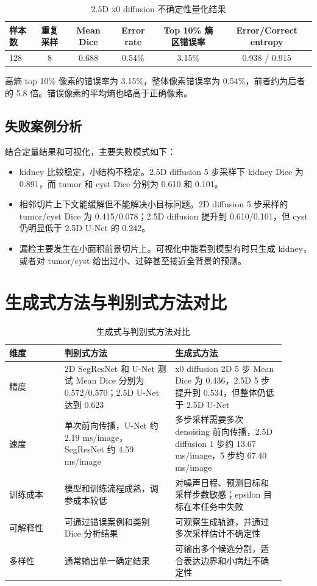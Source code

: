\documentclass[lang=cn,11pt,a4paper]{elegantpaper}
\begin{document}
\begin{table}[H]
\centering
\caption{2.5D x0 diffusion 不确定性量化结果}
\label{tab:uncertainty_summary}
\begin{tabular}{lccccc}
\toprule
样本数 & 重复采样 & Mean Dice & Error rate & Top 10\% 熵区错误率 & Error/Correct entropy \\
\midrule
128 & 8 & 0.688 & 0.54\% & 3.15\% & 0.938 / 0.915 \\
\bottomrule
\end{tabular}
\end{table}

高熵 top 10\% 像素的错误率为 3.15\%，整体像素错误率为 0.54\%，前者约为后者的 5.8 倍。错误像素的平均熵也略高于正确像素。

\subsection{失败案例分析}

结合定量结果和可视化，主要失败模式如下：
\begin{itemize}
    \item kidney 比较稳定，小结构不稳定。2.5D diffusion 5 步采样下 kidney Dice 为 0.891，而 tumor 和 cyst Dice 分别为 0.610 和 0.101。
    \item 相邻切片上下文能缓解但不能解决小目标问题。2D diffusion 5 步采样的 tumor/cyst Dice 为 0.415/0.078；2.5D diffusion 提升到 0.610/0.101，但 cyst 仍明显低于 2.5D U-Net 的 0.242。
    \item 漏检主要发生在小面积前景切片上。可视化中能看到模型有时只生成 kidney，或者对 tumor/cyst 给出过小、过碎甚至接近全背景的预测。
\end{itemize}

\section{生成式方法与判别式方法对比}

\begin{table}[H]
\centering
\caption{生成式与判别式方法对比}
\begin{tabular}{p{0.18\linewidth}p{0.36\linewidth}p{0.36\linewidth}}
\toprule
维度 & 判别式方法 & 生成式方法 \\
\midrule
精度 & 2D SegResNet 和 U-Net 测试 Mean Dice 分别为 0.572/0.570；2.5D U-Net 达到 0.623 & x0 diffusion 2D 5 步 Mean Dice 为 0.436，2.5D 5 步提升到 0.534，但整体仍低于 2.5D U-Net \\
速度 & 单次前向传播，U-Net 约 2.19 ms/image，SegResNet 约 4.59 ms/image & 多步采样需要多次 denoising 前向传播，2.5D diffusion 1 步约 13.67 ms/image，5 步约 67.40 ms/image \\
训练成本 & 模型和训练流程成熟，调参成本较低 & 对噪声日程、预测目标和采样步数敏感；epsilon 目标在本任务中失败 \\
可解释性 & 可通过错误案例和类别 Dice 分析结果 & 可观察生成轨迹，并通过多次采样估计不确定性 \\
多样性 & 通常输出单一确定结果 & 可输出多个候选分割，适合表达边界和小病灶不确定性 \\
\bottomrule
\end{tabular}
\end{table}
\end{document}

